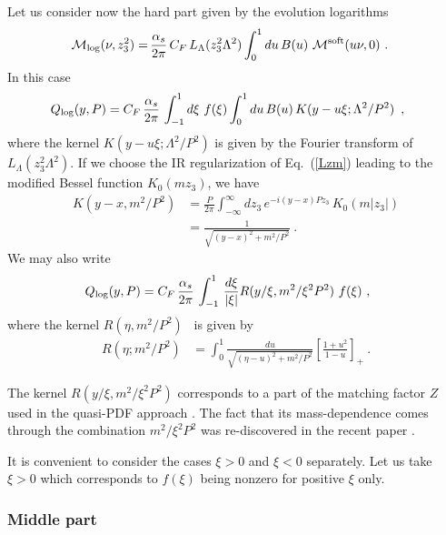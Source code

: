 \documentclass[final,5p,times,twocolumn]{elsarticle}
\begin{document}
Let  us  consider now the hard part  given by
 the evolution logarithms 
     \begin{align}
 {\cal  M}_{\rm log}  (\nu, z_3^2) =&   \,    \frac{\alpha_s}{2\pi} \, C_F\,  L_ \Lambda (z_3^2  \Lambda^2 )  
\int_0^1  du \,  B (u) \  {\cal  M}^{\rm soft}  (u \nu, 0)   \  . 
 \label{hardP}
\end{align} 
In this case
 \begin{align}
  Q_{\rm log}  (y, P)  & =
 C_F \, \frac{\alpha_s}{2 \pi}  \, \int_{-1}^1 {d\xi}\, \, f(\xi)  
  \int_{0}^1 du\,  %
 B(u)  \, K(y-u \xi ;\Lambda^2/P^2) \, 
 \  , 
 \
 \label{Mlog}
\end{align} 
where the kernel $ K(y-u \xi ;\Lambda^2/P^2) $ is given by the  Fourier transform of  $L_ \Lambda (z_3^2  \Lambda^2 ) $.
If we choose the IR regularization of \mbox{Eq. (\ref{Lzm})}  leading to  the 
modified Bessel function $K_0 (mz_3)$,  
we have 
 \begin{align}
 K(y-x,m^2/ P^2) &=\frac{P}{2 \pi}  \int_{-\infty}^\infty dz_3\,
      e^{-i(y-x) Pz_3} \, K_0(m|z_3|) 
 \nonumber \\
  &=  \frac{1}{\sqrt{(y -x)^2+m^2/ P^2}} \  . 
 \ 
 \label{Kyx}
\end{align} 
We may  also write 
 \begin{align}
  Q_{\rm log}  (y, P)  & =
 C_F \, \frac{\alpha_s}{2 \pi}  \, \int_{-1}^1 \, 
 \frac{d\xi} {|\xi|}  R(y/\xi, m^2/ \xi^2P^2)
 \  f(\xi) 
 \  , 
 \
 \label{QR}
\end{align} 
where the kernel $R(\eta, m^2/ P^2) $ \, 
  is given by 
   \begin{align}
 R(\eta;m^2/ P^2)  &= \int_{0}^1 \frac{du }{\sqrt{(\eta  -u )^2+m^2/ P^2}} \left [ \frac{1+u^2}{1-u} \right ]_+
  \  .
 \label{Reta}
\end{align} 


The kernel $ R(y/\xi, m^2/ \xi^2P^2)$ corresponds to a part 
of the matching factor $Z$ used in the quasi-PDF approach \cite{Ji:2013dva}.
The fact that its mass-dependence comes through the 
combination $m^2/\xi^2 P^2$ was re-discovered in the recent paper
\cite{Izubuchi:2018srq}. 

It is convenient to consider the cases $\xi>0$ and $\xi<0$ separately.
Let us take $\xi>0$ which corresponds to $f(\xi)$ being nonzero for positive $\xi$ only.


\subsubsection{Middle part}
\end{document}

